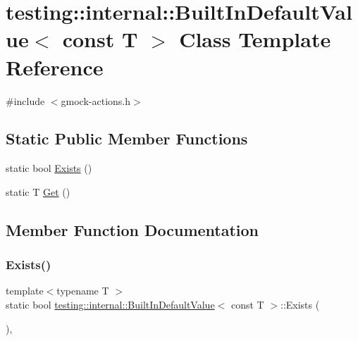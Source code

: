 \hypertarget{classtesting_1_1internal_1_1_built_in_default_value_3_01const_01_t_01_4}{}\section{testing\+:\+:internal\+:\+:Built\+In\+Default\+Value$<$ const T $>$ Class Template Reference}
\label{classtesting_1_1internal_1_1_built_in_default_value_3_01const_01_t_01_4}


{\ttfamily \#include $<$gmock-\/actions.\+h$>$}

\subsection*{Static Public Member Functions}
\begin{DoxyCompactItemize}
\item 
static bool \hyperlink{classtesting_1_1internal_1_1_built_in_default_value_3_01const_01_t_01_4_a1814803ec5dcc660ee1f1092a96b79fa}{Exists} ()
\item 
static T \hyperlink{classtesting_1_1internal_1_1_built_in_default_value_3_01const_01_t_01_4_a5996754952ecbcc5da77a2cebd4722de}{Get} ()
\end{DoxyCompactItemize}


\subsection{Member Function Documentation}
\mbox{\label{classtesting_1_1internal_1_1_built_in_default_value_3_01const_01_t_01_4_a1814803ec5dcc660ee1f1092a96b79fa}} 
\subsubsection{\texorpdfstring{Exists()}{Exists()}}
{\footnotesize\ttfamily template$<$typename T $>$ \\
static bool \hyperlink{classtesting_1_1internal_1_1_built_in_default_value}{testing\+::internal\+::\+Built\+In\+Default\+Value}$<$ const T $>$\+::Exists (\begin{DoxyParamCaption}{ }\end{DoxyParamCaption})\hspace{0.3cm}{\ttfamily [inline]}, {\ttfamily [static]}}

